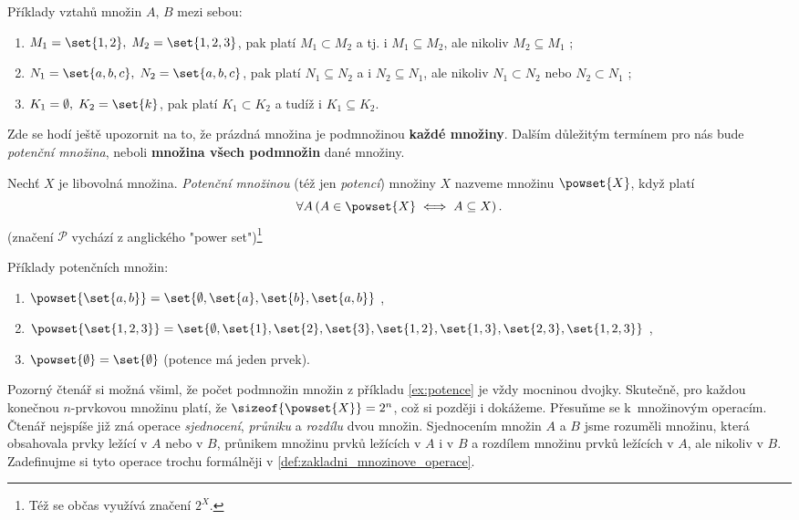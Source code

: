\begin{example}
    Příklady vztahů množin $A,\,B$ mezi sebou:
    \begin{enumerate}[label=(\roman*)]
        \item $M_1=\set{1,2},\; M_2=\set{1,2,3}$, pak platí $M_1 \subset M_2$ a tj. i $M_1 \subseteq M_2$, ale nikoliv $M_2 \subseteq M_1$ ;
        \item $N_1=\set{a,b,c},\; N_2=\set{a,b,c}$, pak platí $N_1 \subseteq N_2$ a i $N_2 \subseteq N_1$, ale nikoliv $N_1 \subset N_2$ nebo $N_2 \subset N_1$ ;
        \item $K_1=\emptyset,\; K_2=\set{k}$, pak platí $K_1 \subset K_2$ a tudíž i $K_1 \subseteq K_2$.
    \end{enumerate}
\end{example}
Zde se hodí ještě upozornit na to, že prázdná množina je podmnožinou \textbf{každé množiny}. Dalším důležitým termínem pro nás bude \emph{potenční množina}, neboli \textbf{množina všech podmnožin} dané množiny.
\begin{definition}\label{def:potence}
    Nechť $X$ je libovolná množina. \emph{Potenční množinou} (též jen \emph{potencí}) množiny $X$ nazveme množinu $\powset{X}$, když platí
    \begin{equation*}
        \forall A \left(A \in \powset{X} \iff A \subseteq X\right).
    \end{equation*}
    (značení $\mathcal{P}$ vychází z anglického "power set")\footnote{Též se občas využívá značení $2^{X}$.}
\end{definition} 
\begin{example}\label{ex:potence}
    Příklady potenčních množin:
    \begin{enumerate}[label=(\roman*)]
        \item $\powset{\set{a,b}}=\set{\emptyset,\set{a},\set{b},\set{a,b}}$ ,
        \item $\powset{\set{1,2,3}}=\set{\emptyset,\set{1},\set{2},\set{3},\set{1,2},\set{1,3},\set{2,3},\set{1,2,3}}$ ,
        \item $\powset{\emptyset}=\set{\emptyset}$ (potence má jeden prvek).
    \end{enumerate}
\end{example}
Pozorný čtenář si možná všiml, že počet podmnožin množin z příkladu \ref{ex:potence} je vždy mocninou dvojky. Skutečně, pro každou konečnou $n$-prvkovou množinu platí, že $\sizeof{\powset{X}}=2^n$, což si později i dokážeme.
Přesuňme se k~množinovým operacím. Čtenář nejspíše již zná operace \emph{sjednocení}, \emph{průniku} a \emph{rozdílu} dvou množin. Sjednocením množin $A$ a $B$ jsme rozuměli množinu, která obsahovala prvky ležící v $A$ nebo v $B$, průnikem množinu prvků ležících v $A$ i v $B$ a rozdílem množinu prvků ležících v $A$, ale nikoliv v $B$. Zadefinujme si tyto operace trochu formálněji v \ref{def:zakladni_mnozinove_operace}. 
